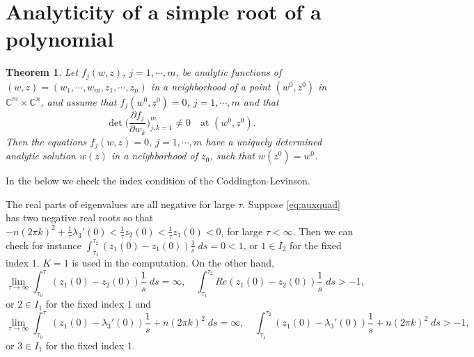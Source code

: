 \documentclass[a4paper,11pt]{article}
\newtheorem{theorem}{Theorem}
\theoremstyle{remark}
\begin{document}
\section{Analyticity of a simple root of a polynomial}



\begin{theorem}{\cite[p. 24]{L1966}} \label{thm:anal} Let $f_j(w,z)$, $j=1,\cdots,m$, be analytic functions of $(w,z)=(w_1,\cdots,w_m,z_1,\cdots,z_n)$ in a neighborhood of a point $(w^0,z^0)$ in $\mathbb{C}^m\times \mathbb{C}^n$, and assume that $f_j(w^0,z^0)=0$, $j=1,\cdots,m$ and that
$$ \det\Big( \frac{\partial f_j}{\partial w_k} \Big)_{j,k=1}^m \ne 0 \quad \text{at $(w^0,z^0)$}.$$
Then the equations $f_j(w,z)=0$, $j=1,\cdots,m$ have a uniquely determined analytic solution $w(z)$ in a neighborhood of $z_0$, such that $w(z^0)=w^0$.
\end{theorem}


In the below we check the index condition of the Coddington-Levinson.

 The real parts of eigenvalues are all negative for large $\tau$. Suppose \eqref{eq:auxquad} has two negative real roots so that  $-n(2\pi k)^2 + \frac{1}{\tau}\lambda_3'(0)<\frac{1}{\tau}z_2(0)<\frac{1}{\tau}z_1(0)<0$, for large $\tau<\infty$.  Then we can check for instance
$\displaystyle\int_{\tau_1}^{\tau_2} (z_1(0)-z_1(0))\frac{1}{s} \; ds = 0< 1$,
or $1\in I_2$ for the fixed index $1$. $K=1$ is used in the computation. On the other hand,
$$ \lim_{\tau \rightarrow \infty}\int_{\tau_0}^\tau (z_1(0)-z_2(0))\frac{1}{s} \; ds = \infty, \quad  \int_{\tau_1}^{\tau_2} Re (z_1(0)-z_2(0))\frac{1}{s} \; ds > -1,$$
or $2\in I_1$ for the fixed index $1$ and
$$ \lim_{\tau \rightarrow \infty}\int_{\tau_0}^\tau (z_1(0)-\lambda_3'(0))\frac{1}{s} + n(2\pi k)^2 \; ds =\infty, \quad  \int_{\tau_1}^{\tau_2} (z_1(0)-\lambda_3'(0))\frac{1}{s} + n(2\pi k)^2 \; ds > -1,$$
or $3\in I_1$ for the fixed index $1$.
\end{document}
